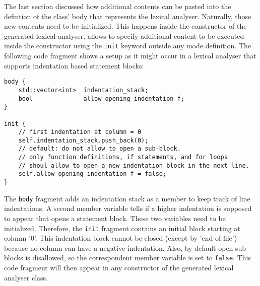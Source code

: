 The last section discussed how additional contents can be pasted into the
defintion of the class' body that represents the lexical analyser. Naturally,
those new contents need to be initialized. This happens inside the constructor
of the generated lexical analyser. {\Quex} allows to specify additional
content to be executed inside the constructor using the {\tt init} keyword
outside any mode definition. The following code fragment shows a setup as
it might occur in a lexical analyser that supports indentation based 
statement blocks:

\begin{lstlisting}
body {
    std::vector<int>  indentation_stack;
    bool              allow_opening_indentation_f;
}

init {
    // first indentation at column = 0
    self.indentation_stack.push_back(0);
    // default: do not allow to open a sub-block.
    // only function definitions, if statements, and for loops
    // shoul allow to open a new indentation block in the next line.
    self.allow_opening_indentation_f = false;
}
\end{lstlisting}

The {\tt body} fragment adds an indentation stack as a member to keep track of
line indentations. A second member variable tells if a higher indentation is
supposed to appear that opens a statement block. These two variables need to
be initialized. Therefore, the {\tt init} fragment contains an initial block
starting at column '0'. This indentation block cannot be closed (except by
'end-of-file') because no column can have a negative indentation. Also, by
default open sub-blocks is disallowed, so the correspondent member variable is
set to {\tt false}. This code fragment will then appear in any constructor
of the generated lexical analyser class.


